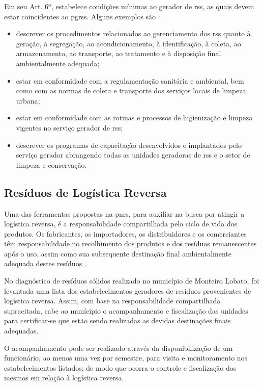 	
	Em seu Art. 6º, estabelece condições mínimas ao gerador de \gls{rss}, as quais devem estar coincidentes ao \gls{pgrss}. Alguns exemplos são \cite{anvisa:222:2018}:
	
	\begin{itemize}
		\item descrever os procedimentos relacionados ao gerenciamento dos \gls{rss} quanto à geração, à segregação, ao acondicionamento, à identificação, à coleta, ao armazenamento, ao transporte, ao tratamento e à disposição final ambientalmente adequada;
		\item  estar em conformidade com a regulamentação sanitária e ambiental, bem como com as normas de coleta e transporte dos serviços locais de limpeza urbana;

		\item estar em conformidade com as rotinas e processos de higienização e limpeza	vigentes no serviço gerador de \gls{rss};
		\item descrever os programas de capacitação desenvolvidos e implantados pelo serviço gerador abrangendo todas as unidades geradoras de \gls{rss} e o setor de limpeza e conservação.
	\end{itemize}
	
	\subsection{Resíduos de Logística Reversa}
	Uma das ferramentas propostas na \gls{pnrs}, para auxiliar na busca por atingir a logística reversa, é a responsabilidade compartilhada pelo ciclo de vida dos produtos. Os fabricantes, os importadores, os distribuidores e os comerciantes têm responsabilidade no recolhimento dos produtos e dos resíduos remanescentes após o uso, assim como sua subsequente destinação final ambientalmente adequada destes resíduos \cite{brasil:12305}.
	
	No diagnóstico de resíduos sólidos realizado no município de Monteiro Lobato, foi levantada uma lista dos estabelecimentos geradores de resíduos provenientes de logística reversa. Assim, com base na responsabilidade compartilhada supracitada, cabe ao munícipio o acompanhamento e fiscalização das unidades para certificar-se que estão sendo realizadas as devidas destinações finais adequadas. 
	
	O acompanhamento pode ser realizado através da disponibilização de um funcionário, ao menos uma vez por semestre, para visita e monitoramento nos estabelecimentos listados; de modo que ocorra o controle e fiscalização dos mesmos em relação à logística reversa.
	
